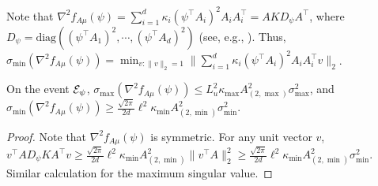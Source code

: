 Note that $\nabla^2f_{A\mu}(\psi) = \sum_{i=1}^{d} \kappa_i(\psi^{\top}A_i)^2A_iA_i^{\top} = AKD_{\psi}A^{\top}$,  where $D_{\psi} = \text{diag}\left((\psi^{\top}A_1)^2,\cdots, (\psi^{\top}A_d)^2\right)$ (see, e.g., \citealt{hsu2013learning}). 
Thus, $\sigma_{\min}(\nabla^2f_{A\mu}(\psi)) = \min_{v:\|v\|_2=1}\|\sum_{i=1}^{d} \kappa_i(\psi^{\top}A_i)^2A_iA_i^{\top}v\|_2$. 
\begin{lemma}
\label{lem:boundsigmaminnabla}
On the event $\mathcal{E}_{\psi}$, $\sigma_{\max}(\nabla^2f_{A\mu}(\psi)) \le L_u^2 \kappa_{\max}A^2_{(2,\max)}\sigma_{\max}^2$, and
 $\sigma_{\min}(\nabla^2f_{A\mu}(\psi)) \ge \frac{\sqrt{2\pi}}{2d} \ell^2\kappa_{\min}A^2_{(2,\min)}\sigma_{\min}^2$.
\end{lemma}
\begin{proof}
Note that $\nabla^2f_{A\mu}(\psi)$ is symmetric. 
For any unit vector $v$, $v^{\top}AD_{\psi}KA^{\top}v \ge \frac{\sqrt{2\pi}}{2d}\ell^2\kappa_{\min} A^2_{(2,\min)}\|v^{\top}A\|_2^2 \ge \frac{\sqrt{2\pi}}{2d}\ell^2\kappa_{\min}A^2_{(2,\min)}\sigma_{\min}^2$. Similar calculation for the maximum singular value.
\end{proof}

